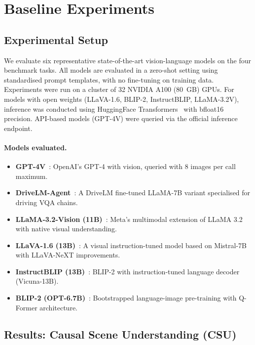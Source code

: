 \section{Baseline Experiments}
\label{sec:experiments}

\subsection{Experimental Setup}
\label{ssec:exp_setup}

We evaluate six representative state-of-the-art vision-language models on the four
\lucid{} benchmark tasks. All models are evaluated in a zero-shot setting using
standardised prompt templates, with no fine-tuning on \lucid{} training data.
Experiments were run on a cluster of 32 NVIDIA A100 (80~GB) GPUs. For models with
open weights (LLaVA-1.6, BLIP-2, InstructBLIP, LLaMA-3.2V), inference was conducted
using HuggingFace Transformers~\cite{wolf2020transformers} with bfloat16 precision.
API-based models (GPT-4V) were queried via the official inference endpoint.

\paragraph{Models evaluated.}
\begin{itemize}[leftmargin=2em, noitemsep]
  \item \textbf{GPT-4V}~\cite{openai2023gpt4}: OpenAI's GPT-4 with vision, queried
        with 8 images per call maximum.
  \item \textbf{DriveLM-Agent}~\cite{sima2023drivelm}: A DriveLM fine-tuned LLaMA-7B
        variant specialised for driving VQA chains.
  \item \textbf{LLaMA-3.2-Vision (11B)}~\cite{meta2024llama3}: Meta's multimodal
        extension of LLaMA 3.2 with native visual understanding.
  \item \textbf{LLaVA-1.6 (13B)}~\cite{liu2023visual}: A visual instruction-tuned model
        based on Mistral-7B with LLaVA-NeXT improvements.
  \item \textbf{InstructBLIP (13B)}~\cite{dai2023instructblip}: BLIP-2 with
        instruction-tuned language decoder (Vicuna-13B).
  \item \textbf{BLIP-2 (OPT-6.7B)}~\cite{li2023blip2}: Bootstrapped language-image
        pre-training with Q-Former architecture.
\end{itemize}

\subsection{Results: Causal Scene Understanding (CSU)}
\label{ssec:exp_csu}

